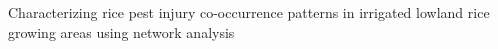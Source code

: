 Characterizing rice pest injury co-occurrence patterns in irrigated lowland rice growing areas using network analysis